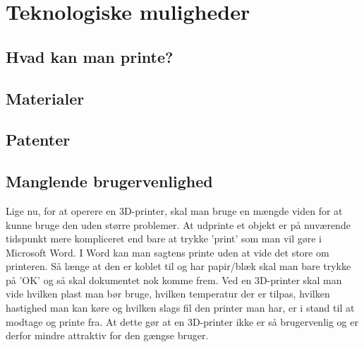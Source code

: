 \section{Teknologiske muligheder} %

\subsection{Hvad kan man printe?} %


\subsection{Materialer} %
\label{sub:materialer}


\subsection{Patenter} %
\label{sub:patenter}


\subsection{Manglende brugervenlighed} %
\label{sub:manglende_brugervenlighed}

Lige nu, for at operere en 3D-printer, skal man bruge en mængde viden for at kunne bruge den uden større problemer. At udprinte et objekt er på nuværende tidspunkt mere kompliceret end bare at trykke ’print’ som man vil gøre i Microsoft Word. I Word kan man sagtens printe uden at vide det store om printeren. Så længe at den er koblet til og har papir/blæk skal man bare trykke på ’OK’ og så skal dokumentet nok komme frem. 
Ved en 3D-printer skal man vide hvilken plast man bør bruge, hvilken temperatur der er tilpas, hvilken hastighed man kan køre og hvilken slags fil den printer man har, er i stand til at modtage og printe fra.
At dette gør at en 3D-printer ikke er så brugervenlig og er derfor mindre attraktiv for den gængse bruger.



